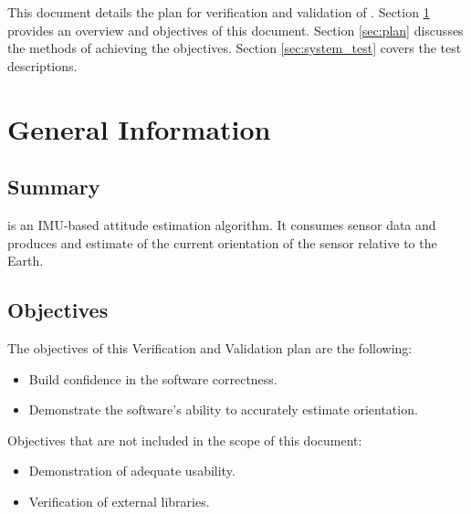 \documentclass[12pt, titlepage]{article}
\begin{document}
This document details the plan for verification and validation of \progname{}. Section \ref{sec:general} provides an overview and objectives of this document. Section \ref{sec:plan} discusses the methods of achieving the objectives. Section \ref{sec:system_test} covers the test descriptions.


\section{General Information} \label{sec:general}

\subsection{Summary}

\progname{} is an IMU-based attitude estimation algorithm. It consumes sensor data and produces and
estimate of the current orientation of the sensor relative to the Earth.


\subsection{Objectives}

The objectives of this Verification and Validation plan are the following:

\begin{itemize}
    \item Build confidence in the software correctness.
    \item Demonstrate the software's ability to accurately estimate orientation.
\end{itemize}


\noindent
Objectives that are not included in the scope of this document:

\begin{itemize}
    \item Demonstration of adequate usability.
    \item Verification of external libraries.
\end{itemize}
\end{document}
